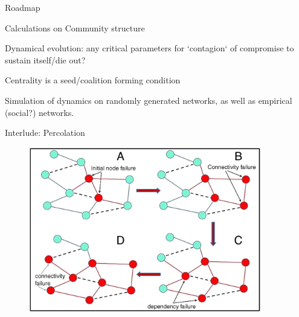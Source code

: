 \documentclass[10pt]{beamer}
\begin{document}
\begin{frame}{Roadmap}

Calculations on Community structure

Dynamical evolution: any critical parameters for `contagion` of compromise to sustain itself/die out?

Centrality is a seed/coalition forming condition

Simulation of dynamics on randomly generated networks, as well as empirical (social?) networks.

\end{frame}

\begin{frame}{Interlude: Percolation}

\begin{figure}[b]
\centering
\includegraphics[width=4in]{percolation.jpg}
\end{figure}
\end{frame}
\end{document}
